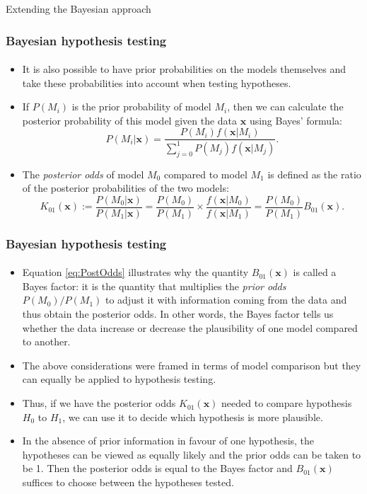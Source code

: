\documentclass[10pt]{beamer}
\theoremstyle{definition}
\begin{document}
\begin{section}{Extending the Bayesian approach}
\begin{frame}[fragile]
\frametitle{Bayesian hypothesis testing}
\framesubtitle{}
\begin{itemize}\itemsep1em
\item It is also possible to have prior probabilities on the models themselves and take these probabilities into account when testing hypotheses. 
\item If $P(M_i)$ is the prior probability of model $M_i$, then we can calculate the posterior probability of this model given the data $\mathbf{x}$ using Bayes' formula:
\begin{equation}
\label{eq:ModelPost}P(M_i|\mathbf{x})=\frac{P(M_i)f(\mathbf{x}|M_i)}{\sum_{j=0}^{1}P(M_j)f(\mathbf{x}|M_j)}.
\end{equation}
\item The \emph{posterior odds} of model $M_0$ compared to model $M_1$ is defined as the ratio of the posterior probabilities of the two models:
\begin{equation}
\label{eq:PostOdds}K_{01}(\mathbf{x}):=\frac{P(M_0|\mathbf{x})}{P(M_1|\mathbf{x})}=\frac{P(M_0)}{P(M_1)}\times
\frac{f(\mathbf{x}|M_0)}{f(\mathbf{x}|M_1)}=\frac{P(M_0)}{P(M_1)}B_{01}(\mathbf{x}).
\end{equation}
\end{itemize}
\end{frame}

\begin{frame}[fragile]
\frametitle{Bayesian hypothesis testing}
\framesubtitle{}
\begin{itemize}\itemsep1em
\item Equation \eqref{eq:PostOdds} illustrates why the quantity $B_{01}(\mathbf{x})$ is called a Bayes factor: it is the quantity that multiplies the \emph{prior odds} $P(M_0)/P(M_1)$ to adjust it with information coming from the data and thus obtain the posterior odds. In other words, the Bayes factor tells us whether the data increase or decrease the plausibility of one model compared to another.
\item The above considerations were framed in terms of model comparison but they can equally be applied to hypothesis testing.
\item Thus, if we have the posterior odds $K_{01}(\mathbf{x})$ needed to compare hypothesis $H_0$ to $H_1$, we can use it to decide which hypothesis is more plausible.
\item In the absence of prior information in favour of one hypothesis, the hypotheses can be viewed as equally likely and the prior odds can be taken to be 1. Then the posterior odds is equal to the Bayes factor and $B_{01}(\mathbf{x})$ suffices to choose between the hypotheses tested.
\end{itemize}
\end{frame}


\end{section}
\end{document}
